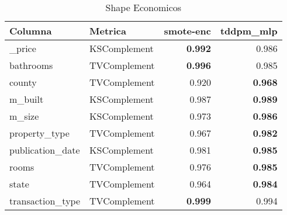 \begin{table}[H]
\centering
\caption{Shape Economicos}
\label{table-shape-economicos-a-2}
\begin{tabular}{|l|l|r|r|}
\hline
\rowcolor[gray]{0.8}
Columna & Metrica & smote-enc & tddpm\_mlp \\
\hline \_price & KSComplement & \bfseries 0.992 & 0.986 \\
\hline bathrooms & TVComplement & \bfseries 0.996 & 0.985 \\
\hline county & TVComplement & 0.920 & \bfseries 0.968 \\
\hline m\_built & KSComplement & 0.987 & \bfseries 0.989 \\
\hline m\_size & KSComplement & 0.973 & \bfseries 0.986 \\
\hline property\_type & TVComplement & 0.967 & \bfseries 0.982 \\
\hline publication\_date & KSComplement & 0.981 & \bfseries 0.985 \\
\hline rooms & TVComplement & 0.976 & \bfseries 0.985 \\
\hline state & TVComplement & 0.964 & \bfseries 0.984 \\
\hline transaction\_type & TVComplement & \bfseries 0.999 & 0.994 \\
\hline
\end{tabular}
\end{table}
